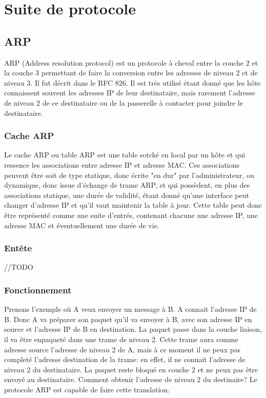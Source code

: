 \section{Suite de protocole}

\subsection{ARP} ARP (Address resolution protocol) est un protocole à cheval
entre la couche 2 et la couche 3 permettant de faire la conversion entre les
adresses de niveau 2 et de niveau 3. Il fut décrit dans le RFC 826\cite{url-RFC-ARP}.
Il est très utilisé étant donné que les hôte connaissent souvent les adresses
IP de leur destinataire, mais rarement l'adresse de niveau 2 de ce destinataire
ou de la passerelle à contacter pour joindre le destinataire.

\subsubsection{Cache ARP} Le cache ARP ou table ARP est une table sotcké en
local par un hôte et qui ressence les associations entre adresse IP et adresse
MAC.  Ces associations peuvent être soit de type statique, donc écrite "en dur"
par l'administrateur, ou dynamique, donc issue d'échange de trame ARP, et qui
possèdent, en plus des associations statique, une durée de validité, étant
donné qu'une interface peut changer d'adresse IP et qu'il vaut maintenir la
table à jour.  Cette table peut donc être représenté comme une suite d'entrés,
contenant chacune une adresse IP, une adresse MAC et éventuellement une durée
de vie.

\subsubsection{Entête}
//TODO


\subsubsection{Fonctionnement} Prenons l'exemple où A veux envoyer un message à
B. A connait l'adresse IP de B. Donc A va préparer son paquet qu'il va envoyer
à B, avec son adresse IP en source et l'adresse IP de B en destination. La
paquet passe dans la couche liaison, il va être enpaqueté dans une trame de
niveau 2. Cette trame aura comme adresse source l'adresse de niveau 2 de A,
mais à ce moment il ne peux pas completé l'adresse destination de la trame: en
effet, il ne connait l'adresse de niveau 2 du destinataire. La paquet reste
bloqué en couche 2 et ne peux pas être envoyé au destinataire. Comment obtenir
l'adresse de niveau 2 du destinaire?  Le protocole ARP est capable de faire
cette translation.

